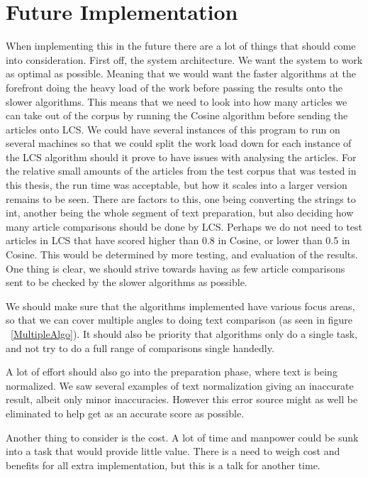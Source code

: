\chapter{Future Implementation}
When implementing this in the future there are a lot of things that should come into consideration. First off, the system architecture. We want the system to work as optimal as possible. Meaning that we would want the faster algorithms at the forefront doing the heavy load of the work before passing the results onto the slower algorithms. This means that we need to look into how many articles we can take out of the corpus by running the Cosine algorithm before sending the articles onto LCS. We could have several instances of this program to run on several machines so that we could split the work load down for each instance of the LCS algorithm should it prove to have issues with analysing the articles. For the relative small amounts of the articles from the test corpus that was tested in this thesis, the run time was acceptable, but how it scales into a larger version remains to be seen. There are factors to this, one being converting the strings to int, another being the whole segment of text preparation, but also deciding how many article comparisons should be done by LCS. Perhaps we do not need to test articles in LCS that have scored higher than 0.8 in Cosine, or lower than 0.5 in Cosine. This would be determined by more testing, and evaluation of the results. One thing is clear, we should strive towards having as few article comparisons sent to be checked by the slower algorithms as possible.

We should make sure that the algorithms implemented have various focus areas, so that we can cover multiple angles to doing text comparison (as seen in figure ~\ref{MultipleAlgo}). It should also be priority that algorithms only do a single task, and not try to do a full range of comparisons single handedly.

A lot of effort should also go into the preparation phase, where text is being normalized. We saw several examples of text normalization giving an inaccurate result, albeit only minor inaccuracies. However this error source might as well be eliminated to help get as an accurate score as possible.

Another thing to consider is the cost. A lot of time and manpower could be sunk into a task that would provide little value. There is a need to weigh cost and benefits for all extra implementation, but this is a talk for another time.

